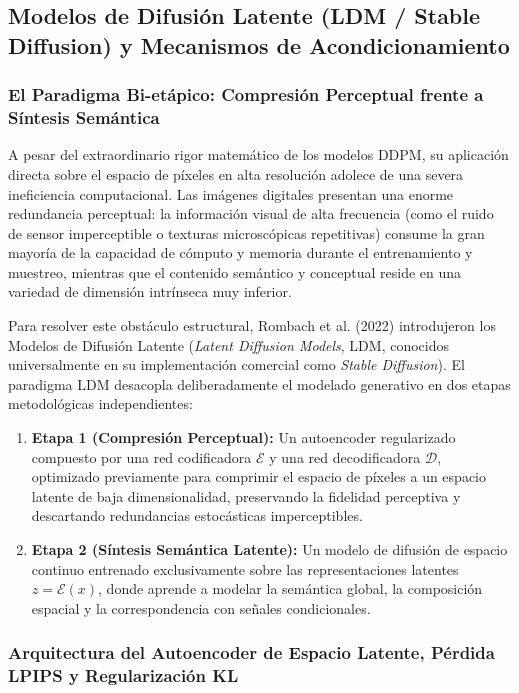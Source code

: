 \subsection{Modelos de Difusión Latente (LDM / Stable Diffusion) y Mecanismos de Acondicionamiento}

\subsubsection{El Paradigma Bi-etápico: Compresión Perceptual frente a Síntesis Semántica}

A pesar del extraordinario rigor matemático de los modelos DDPM, su aplicación directa sobre el espacio de píxeles en alta resolución adolece de una severa ineficiencia computacional. Las imágenes digitales presentan una enorme redundancia perceptual: la información visual de alta frecuencia (como el ruido de sensor imperceptible o texturas microscópicas repetitivas) consume la gran mayoría de la capacidad de cómputo y memoria durante el entrenamiento y muestreo, mientras que el contenido semántico y conceptual reside en una variedad de dimensión intrínseca muy inferior.

Para resolver este obstáculo estructural, Rombach et al. (2022) introdujeron los Modelos de Difusión Latente (\textit{Latent Diffusion Models}, LDM, conocidos universalmente en su implementación comercial como \textit{Stable Diffusion}). El paradigma LDM desacopla deliberadamente el modelado generativo en dos etapas metodológicas independientes:

\begin{enumerate}
    \item \textbf{Etapa 1 (Compresión Perceptual):} Un autoencoder regularizado compuesto por una red codificadora $\mathcal{E}$ y una red decodificadora $\mathcal{D}$, optimizado previamente para comprimir el espacio de píxeles a un espacio latente de baja dimensionalidad, preservando la fidelidad perceptiva y descartando redundancias estocásticas imperceptibles.
    \item \textbf{Etapa 2 (Síntesis Semántica Latente):} Un modelo de difusión de espacio continuo entrenado exclusivamente sobre las representaciones latentes $z = \mathcal{E}(x)$, donde aprende a modelar la semántica global, la composición espacial y la correspondencia con señales condicionales.
\end{enumerate}

\subsubsection{Arquitectura del Autoencoder de Espacio Latente, Pérdida LPIPS y Regularización KL}

